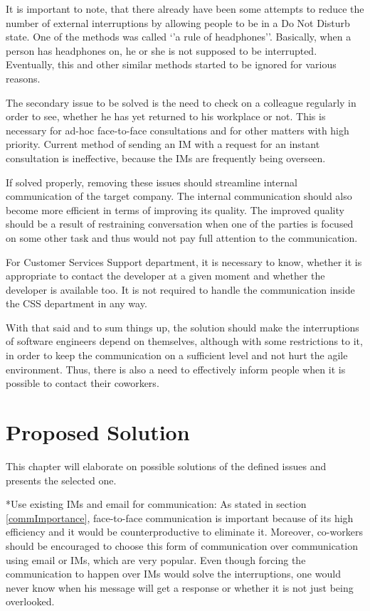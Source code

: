\documentclass[11pt,singleside]{myfithesis2}
\makeatletter
\renewcommand\paragraph{
   \vspace{-10pt}
   \@startsection{paragraph}{4}{0mm}
      {\baselineskip}
      {- 5pt}
      {\normalfont\normalsize\bfseries}
}
\makeatother
\begin{document}
It is important to note, that there already have been some attempts to reduce the number of external interruptions by allowing people to be in a Do Not Disturb state. One of the methods was called `'a rule of headphones''. Basically, when a person has headphones on, he or she is not supposed to be interrupted. Eventually, this and other similar methods started to be ignored for various reasons.

The secondary issue to be solved is the need to check on a colleague regularly in order to see, whether he has yet returned to his workplace or not. This is necessary for ad-hoc face-to-face consultations and for other matters with high priority. Current method of sending an IM with a request for an instant consultation is ineffective, because the IMs are frequently being overseen.

If solved properly, removing these issues should streamline internal communication of the target company. The internal communication should also become more efficient in terms of improving its quality. The improved quality should be a result of restraining conversation when one of the parties is focused on some other task and thus would not pay full attention to the communication.

For Customer Services Support department, it is necessary to know, whether it is appropriate to contact the developer at a given moment and whether the developer is available too. It is not required to handle the communication inside the CSS department in any way.

With that said and to sum things up, the solution should make the interruptions of software engineers depend on themselves, although with some restrictions to it, in order to keep the communication on a sufficient level and not hurt the agile environment. Thus, there is also a need to effectively inform people when it is possible to contact their coworkers.


\chapter{Proposed Solution}
This chapter will elaborate on possible solutions of the defined issues and presents the selected one.

\paragraph*{Use existing IMs and email for communication: } As stated in section \ref{commImportance}, face-to-face communication is important because of its high efficiency and it would be counterproductive to eliminate it. Moreover, co-workers should be encouraged to choose this form of communication over communication using email or IMs, which are very popular. Even though forcing the communication to happen over IMs would solve the interruptions, one would never know when his message will get a response or whether it is not just being overlooked.
\end{document}
